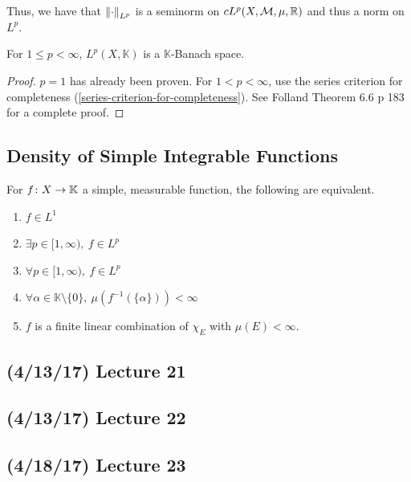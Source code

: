 \documentclass[11pt,leqno,oneside]{amsbook}
\numberwithin{thm}{section}
\newcommand{\M}{\mathcal{M}}
\newcommand{\K}{\mathbb{K}} %
\begin{document}
Thus, we have that \(\left\lVert\cdot\right\rVert_{L^p}\) is a seminorm on
\(cL^p(X,\M,\mu,\R)\) and thus a norm on \(L^p\).
\begin{thm}
  For \(1 \leq p < \infty\), \(L^p(X,\K)\) is a \(\K\)-Banach space.
\end{thm}
\begin{proof}
  \(p=1\) has already been proven. For \(1 < p < \infty\), use
  the series criterion for completeness
  (\ref{series-criterion-for-completeness}). See Folland Theorem 6.6 p
  183 for a complete proof.
\end{proof}
\subsection{Density of Simple Integrable Functions}
\begin{thm}
  For \(f \from X \to \K\) a simple, measurable function, the
  following are equivalent.
  \begin{enumerate}
  \item \(f \in L^1\)
  \item \(\exists p \in [1,\infty), \ f \in L^p\)
  \item \(\forall p \in [1,\infty), \ f \in L^p\)
  \item \(\forall \alpha \in \K \setminus \{0\}, \
    \mu(f^{-1}(\{\alpha\})) < \infty\)
  \item \(f\) is a finite linear combination of \(\chi_E\) with
    \(\mu(E) < \infty\).
  \end{enumerate}
\end{thm}
\subsection*{(4/13/17) Lecture 21}
\subsection*{(4/13/17) Lecture 22}
\subsection*{(4/18/17) Lecture 23}
\end{document}

